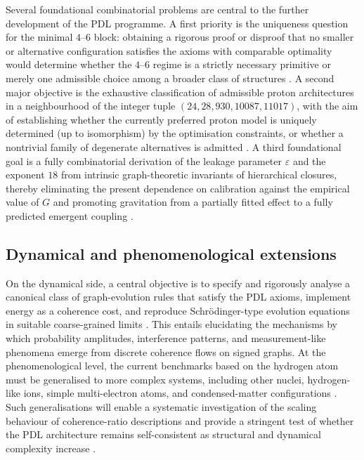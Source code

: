 \documentclass{article}
\begin{document}
Several foundational combinatorial problems are central to the further development of the PDL programme. A first priority is the uniqueness question for the minimal $4$–$6$ block: obtaining a rigorous proof or disproof that no smaller or alternative configuration satisfies the axioms with comparable optimality would determine whether the $4$–$6$ regime is a strictly necessary primitive or merely one admissible choice among a broader class of structures \cite{PDL_Main_2026,PDL_position}. A second major objective is the exhaustive classification of admissible proton architectures in a neighbourhood of the integer tuple $(24,28,930,10087,11017)$, with the aim of establishing whether the currently preferred proton model is uniquely determined (up to isomorphism) by the optimisation constraints, or whether a nontrivial family of degenerate alternatives is admitted \cite{Combinatorial_Proton_v2_2026,PDL_position}. A third foundational goal is a fully combinatorial derivation of the leakage parameter $\varepsilon$ and the exponent $18$ from intrinsic graph-theoretic invariants of hierarchical closures, thereby eliminating the present dependence on calibration against the empirical value of $G$ and promoting gravitation from a partially fitted effect to a fully predicted emergent coupling \cite{Exponent_18_PDL_2026,Coherence_Leakage_18_2026,PDL_position}.

\subsection{Dynamical and phenomenological extensions}
\label{subsec:roadmap_dynamical}

On the dynamical side, a central objective is to specify and rigorously analyse a canonical class of graph-evolution rules that satisfy the PDL axioms, implement energy as a coherence cost, and reproduce Schr\"odinger-type evolution equations in suitable coarse-grained limits \cite{Coherence_Leakage_18_2026,Coherence_Leakage_18_2026}. This entails elucidating the mechanisms by which probability amplitudes, interference patterns, and measurement-like phenomena emerge from discrete coherence flows on signed graphs. At the phenomenological level, the current benchmarks based on the hydrogen atom must be generalised to more complex systems, including other nuclei, hydrogen-like ions, simple multi-electron atoms, and condensed-matter configurations \cite{PDL_Main_2026,Schrodinger_Sketch_v2_2026}. Such generalisations will enable a systematic investigation of the scaling behaviour of coherence-ratio descriptions and provide a stringent test of whether the PDL architecture remains self-consistent as structural and dynamical complexity increase \cite{PDL_position}.
\end{document}
